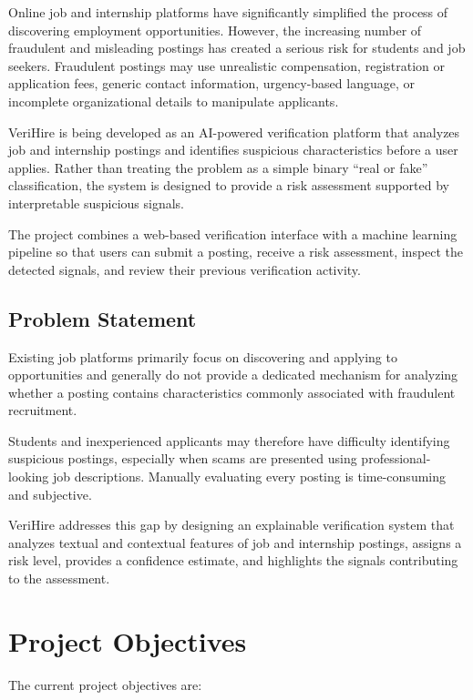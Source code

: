 \documentclass[12pt,a4paper]{report}
\begin{document}
Online job and internship platforms have significantly simplified the process of discovering employment opportunities. However, the increasing number of fraudulent and misleading postings has created a serious risk for students and job seekers. Fraudulent postings may use unrealistic compensation, registration or application fees, generic contact information, urgency-based language, or incomplete organizational details to manipulate applicants.

VeriHire is being developed as an AI-powered verification platform that analyzes job and internship postings and identifies suspicious characteristics before a user applies. Rather than treating the problem as a simple binary ``real or fake'' classification, the system is designed to provide a risk assessment supported by interpretable suspicious signals.

The project combines a web-based verification interface with a machine learning pipeline so that users can submit a posting, receive a risk assessment, inspect the detected signals, and review their previous verification activity.

\subsection{Problem Statement}

Existing job platforms primarily focus on discovering and applying to opportunities and generally do not provide a dedicated mechanism for analyzing whether a posting contains characteristics commonly associated with fraudulent recruitment.

Students and inexperienced applicants may therefore have difficulty identifying suspicious postings, especially when scams are presented using professional-looking job descriptions. Manually evaluating every posting is time-consuming and subjective.

VeriHire addresses this gap by designing an explainable verification system that analyzes textual and contextual features of job and internship postings, assigns a risk level, provides a confidence estimate, and highlights the signals contributing to the assessment.

\section{Project Objectives}

The current project objectives are:
\end{document}
